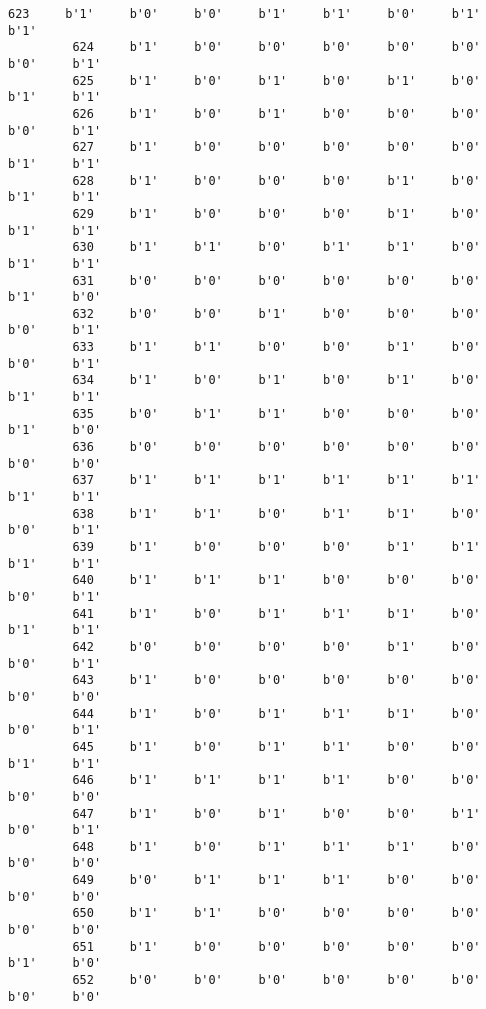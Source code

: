 \documentclass[11pt]{article}
\begin{document}
\begin{Verbatim}[commandchars=\\\{\}]
         623     b'1'     b'0'     b'0'     b'1'     b'1'     b'0'     b'1'     b'1'   
         624     b'1'     b'0'     b'0'     b'0'     b'0'     b'0'     b'0'     b'1'   
         625     b'1'     b'0'     b'1'     b'0'     b'1'     b'0'     b'1'     b'1'   
         626     b'1'     b'0'     b'1'     b'0'     b'0'     b'0'     b'0'     b'1'   
         627     b'1'     b'0'     b'0'     b'0'     b'0'     b'0'     b'1'     b'1'   
         628     b'1'     b'0'     b'0'     b'0'     b'1'     b'0'     b'1'     b'1'   
         629     b'1'     b'0'     b'0'     b'0'     b'1'     b'0'     b'1'     b'1'   
         630     b'1'     b'1'     b'0'     b'1'     b'1'     b'0'     b'1'     b'1'   
         631     b'0'     b'0'     b'0'     b'0'     b'0'     b'0'     b'1'     b'0'   
         632     b'0'     b'0'     b'1'     b'0'     b'0'     b'0'     b'0'     b'1'   
         633     b'1'     b'1'     b'0'     b'0'     b'1'     b'0'     b'0'     b'1'   
         634     b'1'     b'0'     b'1'     b'0'     b'1'     b'0'     b'1'     b'1'   
         635     b'0'     b'1'     b'1'     b'0'     b'0'     b'0'     b'1'     b'0'   
         636     b'0'     b'0'     b'0'     b'0'     b'0'     b'0'     b'0'     b'0'   
         637     b'1'     b'1'     b'1'     b'1'     b'1'     b'1'     b'1'     b'1'   
         638     b'1'     b'1'     b'0'     b'1'     b'1'     b'0'     b'0'     b'1'   
         639     b'1'     b'0'     b'0'     b'0'     b'1'     b'1'     b'1'     b'1'   
         640     b'1'     b'1'     b'1'     b'0'     b'0'     b'0'     b'0'     b'1'   
         641     b'1'     b'0'     b'1'     b'1'     b'1'     b'0'     b'1'     b'1'   
         642     b'0'     b'0'     b'0'     b'0'     b'1'     b'0'     b'0'     b'1'   
         643     b'1'     b'0'     b'0'     b'0'     b'0'     b'0'     b'0'     b'0'   
         644     b'1'     b'0'     b'1'     b'1'     b'1'     b'0'     b'0'     b'1'   
         645     b'1'     b'0'     b'1'     b'1'     b'0'     b'0'     b'1'     b'1'   
         646     b'1'     b'1'     b'1'     b'1'     b'0'     b'0'     b'0'     b'0'   
         647     b'1'     b'0'     b'1'     b'0'     b'0'     b'1'     b'0'     b'1'   
         648     b'1'     b'0'     b'1'     b'1'     b'1'     b'0'     b'0'     b'0'   
         649     b'0'     b'1'     b'1'     b'1'     b'0'     b'0'     b'0'     b'0'   
         650     b'1'     b'1'     b'0'     b'0'     b'0'     b'0'     b'0'     b'0'   
         651     b'1'     b'0'     b'0'     b'0'     b'0'     b'0'     b'1'     b'0'   
         652     b'0'     b'0'     b'0'     b'0'     b'0'     b'0'     b'0'     b'0'   

\end{Verbatim}
\end{document}

